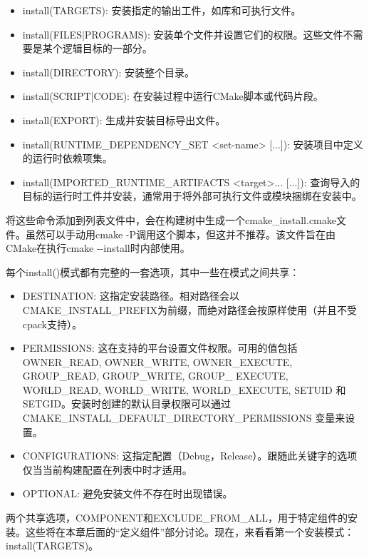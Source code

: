 \begin{itemize}
\item
install(TARGETS): 安装指定的输出工件，如库和可执行文件。

\item
install(FILES|PROGRAMS): 安装单个文件并设置它们的权限。这些文件不需要是某个逻辑目标的一部分。

\item
install(DIRECTORY): 安装整个目录。

\item
install(SCRIPT|CODE): 在安装过程中运行CMake脚本或代码片段。

\item
install(EXPORT): 生成并安装目标导出文件。

\item
install(RUNTIME\_DEPENDENCY\_SET <set-name> [...]): 安装项目中定义的运行时依赖项集。

\item
install(IMPORTED\_RUNTIME\_ARTIFACTS <target>... [...]): 查询导入的目标的运行时工件并安装，通常用于将外部可执行文件或模块捆绑在安装中。
\end{itemize}

将这些命令添加到列表文件中，会在构建树中生成一个cmake\_install.cmake文件。虽然可以手动用cmake -P调用这个脚本，但这并不推荐。该文件旨在由CMake在执行cmake -{}-install时内部使用。

每个install()模式都有完整的一套选项，其中一些在模式之间共享：

\begin{itemize}
\item
DESTINATION: 这指定安装路径。相对路径会以CMAKE\_INSTALL\_PREFIX为前缀，而绝对路径会按原样使用（并且不受cpack支持）。

\item
PERMISSIONS: 这在支持的平台设置文件权限。可用的值包括OWNER\_READ, OWNER\_WRITE, OWNER\_EXECUTE, GROUP\_READ, GROUP\_WRITE, GROUP\_ EXECUTE, WORLD\_READ, WORLD\_WRITE, WORLD\_EXECUTE, SETUID 和 SETGID。安装时创建的默认目录权限可以通过 CMAKE\_INSTALL\_DEFAULT\_DIRECTORY\_PERMISSIONS 变量来设置。

\item
CONFIGURATIONS: 这指定配置（Debug，Release）。跟随此关键字的选项仅当当前构建配置在列表中时才适用。

\item
OPTIONAL: 避免安装文件不存在时出现错误。
\end{itemize}

两个共享选项，COMPONENT和EXCLUDE\_FROM\_ALL，用于特定组件的安装。这些将在本章后面的“定义组件”部分讨论。现在，来看看第一个安装模式：install(TARGETS)。


